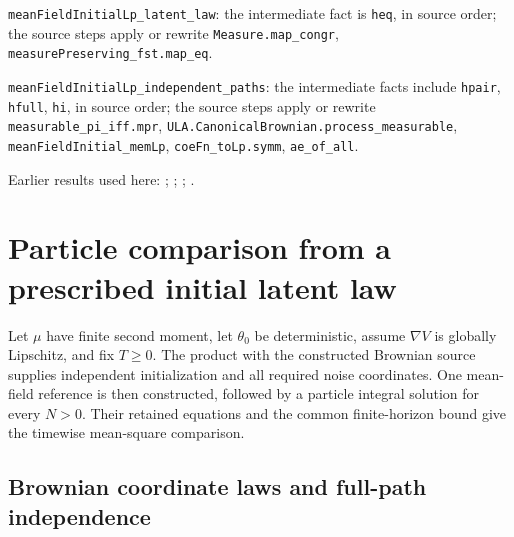 \documentclass[11pt,a4paper]{report}
\begin{document}
\begin{leanbox}
\texttt{mean\allowbreak{}Field\allowbreak{}Initial\allowbreak{}Lp\_\allowbreak{}latent\_\allowbreak{}law}: the intermediate fact is \texttt{heq}, in source order; the source steps apply or rewrite \texttt{Measure.\allowbreak{}map\_\allowbreak{}congr}, \texttt{measure\allowbreak{}Preserving\_\allowbreak{}fst.\allowbreak{}map\_\allowbreak{}eq}.



\texttt{mean\allowbreak{}Field\allowbreak{}Initial\allowbreak{}Lp\_\allowbreak{}independent\_\allowbreak{}paths}: the intermediate facts include \texttt{hpair}, \texttt{hfull}, \texttt{hi}, in source order; the source steps apply or rewrite \texttt{measurable\_\allowbreak{}pi\_\allowbreak{}iff.\allowbreak{}mpr}, \texttt{ULA.\allowbreak{}Canonical\allowbreak{}Brownian.\allowbreak{}process\_\allowbreak{}measurable}, \texttt{mean\allowbreak{}Field\allowbreak{}Initial\_\allowbreak{}mem\allowbreak{}Lp}, \texttt{coe\allowbreak{}Fn\_\allowbreak{}to\allowbreak{}Lp.\allowbreak{}symm}, \texttt{ae\_\allowbreak{}of\_\allowbreak{}all}.
\end{leanbox}


Earlier results used here: \cite[Section~3.8.11]{LangevinLean2026ULASC}; \cite[Section~3.8.16]{LangevinLean2026ULASC}; \cite[Section~3.8.19]{LangevinLean2026ULASC}; \cite[Section~3.3.1]{LangevinLean2026IPLA}.
\section{\texorpdfstring{Particle comparison from a prescribed initial latent law}{Particle comparison from a prescribed initial latent law}}
\label{proof-module-ProximalLangevin-MeanFieldCanonical-lean}


Let \(\mu\) have finite second moment, let \(\theta_0\) be deterministic, assume \(\nabla V\) is globally Lipschitz, and fix \(T\ge0\). The product with the constructed Brownian source supplies independent initialization and all required noise coordinates. One mean-field reference is then constructed, followed by a particle integral solution for every \(N>0\). Their retained equations and the common finite-horizon bound give the timewise mean-square comparison.

\subsection{\texorpdfstring{Brownian coordinate laws and full-path independence}{Brownian coordinate laws and full-path independence}}
\label{report-step-ProximalLangevin-MeanFieldCanonical-lean-1}
\end{document}
